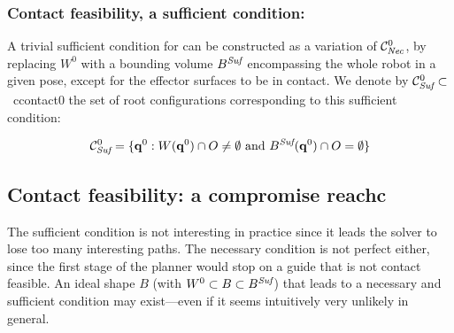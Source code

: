 
\subsubsection*{Contact feasibility, a sufficient condition:}
A trivial sufficient condition for  can be constructed as a variation of $\mathcal{C}^0_{\textrm{\it Nec}}$, by replacing $W^0$ with a bounding volume $B^{\textrm{\it Suf}}$ encompassing the whole robot in a given pose, except for the effector surfaces to be in contact. We denote by \mbox{$\mathcal{C}^0_{\textrm{\it Suf}} \subset $ \gls{ccontact0}} the set of root configurations corresponding to this sufficient condition:

\begin{equation}
\mathcal{C}^0_{\textrm{\it Suf}} = \{ \mathbf{q}^0 : W(\mathbf{q}^{0}) \cap O \neq \emptyset \text{ and } B^{\textrm{\it Suf}}(\mathbf{q}^{0}) \cap O = \emptyset \} %
\end{equation}


\subsection{Contact feasibility: a compromise \gls{reachc}}
The sufficient condition is not interesting in practice since it leads the solver to lose too many interesting paths. The necessary condition is not perfect either, since the first stage of the planner would stop on a guide that is not \gls{contact feasible}. 
An ideal shape $B$ (with $W^0 \subset B \subset B^{\textrm{\it Suf}}$) that leads to a necessary and sufficient condition may exist---even if it seems intuitively very unlikely in general. 

